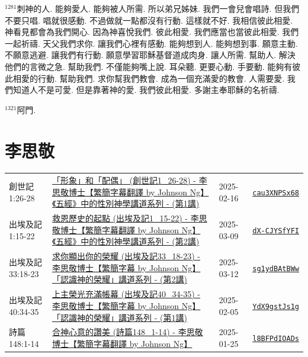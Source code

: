 \documentclass{book}
\begin{document}
$^{1281}$刺神的人.
能夠愛人.
能夠被人所需.
所以弟兄姊妹.
我們一會兒會唱詩.
但我們不要只唱.
唱就很感動.
不過做就一點都沒有行動.
這樣就不好.
我相信彼此相愛.
神看見都會為我們開心.
因為神喜悅我們.
彼此相愛.
我們應當也當彼此相愛.
我們一起祈禱.
天父我們求你.
讓我們心裡有感動.
能夠想到人.
能夠想到事.
願意主動.
不願意逃避.
讓我們有行動.
願意學習耶穌基督道成肉身.
讓人所需.
幫助人.
解決他們的言微之急.
幫助我們.
不僅能夠嘴上說.
耳朵聽.
更要心動.
手要動.
能夠有彼此相愛的行動.
幫助我們.
求你幫我們教會.
成為一個充滿愛的教會.
人需要愛.
我們知道人不是可愛.
但是靠著神的愛.
我們彼此相愛.
多謝主奉耶穌的名祈禱.

$^{1321}$阿門.
\newpage



\chapter{李思敬}\label{ch:preacher5}
\begin{multicols}{3}
\minitoc
\end{multicols}
{ \scriptsize


\begin{xltabular}{\textwidth}{|p{0.15\textwidth} p{0.6\textwidth}|p{0.07\textwidth} p{0.1\textwidth}|}
\hline
創世記 1:26-28 & \hyperref[sec:cau3XNPSx68]{「形象」和「配偶」 (創世記1\_26-28) - 李思敬博士【繁簡字幕翻譯 by Johnson Ng】《五經》中的性別神學講道系列 - (第1講)} & 2025-02-16 & \href{https://youtube.com/watch?v=cau3XNPSx68}{\texttt{cau3XNPSx68}} \\
出埃及記 1:15-22 & \hyperref[sec:dX_CJYSfYFI]{救恩歷史的起點 (出埃及記1\_15-22) - 李思敬博士【繁簡字幕翻譯 by Johnson Ng】《五經》中的性別神學講道系列 - (第2講)} & 2025-03-09 & \href{https://youtube.com/watch?v=dX-CJYSfYFI}{\texttt{dX-CJYSfYFI}} \\
出埃及記 33:18-23 & \hyperref[sec:sg1ydBAtBWw]{求你顯出你的榮耀 (出埃及記33\_18-23) - 李思敬博士【繁簡字幕 by Johnson Ng】「認識神的榮耀」講道系列 - (第2講)} & 2025-03-12 & \href{https://youtube.com/watch?v=sg1ydBAtBWw}{\texttt{sg1ydBAtBWw}} \\
出埃及記 40:34-35 & \hyperref[sec:YdX9gstJs1g]{上主榮光充滿帳幕 (出埃及記40\_34-35) - 李思敬博士【繁簡字幕 by Johnson Ng】「認識神的榮耀」講道系列 - (第1講)} & 2025-02-05 & \href{https://youtube.com/watch?v=YdX9gstJs1g}{\texttt{YdX9gstJs1g}} \\
詩篇 148:1-14 & \hyperref[sec:l8BFPdIOADs]{合神心意的讚美 (詩篇148\_1-14) - 李思敬博士【繁簡字幕翻譯 by Johnson Ng】} & 2025-01-25 & \href{https://youtube.com/watch?v=l8BFPdIOADs}{\texttt{l8BFPdIOADs}} \\
\hline
\end{xltabular}
}
\newpage
\end{document}
